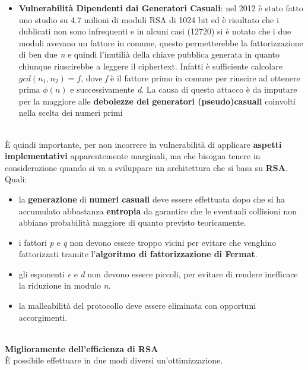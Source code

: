 \begin{itemize}
    \item \textbf{Vulnerabilità Dipendenti dai Generatori Casuali}: nel 2012 è stato fatto uno studio su 4.7 milioni di moduli RSA di 1024 bit ed è risultato che i dublicati non sono infrequenti e in alcuni casi (12720) si è notato che i due moduli avevano un fattore in comune, questo permetterebbe la fattorizzazione di ben due \textit{n} e quindi l'inutilià della chiave pubblica generata in quanto chiunque riuscirebbe a leggere il ciphertext. Infatti è sufficiente calcolare $gcd(n_1, n_2) = f$, dove \textit{f} è il fattore primo in comune per riuscire ad ottenere prima $\phi(n)$ e successivamente \textit{d}. La causa di questo attacco è da imputare per la maggiore alle \textbf{debolezze dei generatori (pseudo)casuali} coinvolti nella scelta dei numeri primi

\end{itemize}
\   \\
È quindi importante, per non incorrere in vulnerabilità di applicare \textbf{aspetti implementativi} apparentemente marginali, ma che bisogna tenere in considerazione quando si va a sviluppare un architettura che si basa su \textbf{RSA}. Quali:
\begin{itemize}
    \item la \textbf{generazione} di \textbf{numeri casuali} deve essere effettuata dopo che si ha accumulato abbastanza \textbf{entropia} da garantire che le eventuali collisioni non abbiano probabilità maggiore di quanto previsto teoricamente.
    \item i fattori \textit{p} e \textit{q} non devono essere troppo vicini per evitare che venghino fattorizzati tramite l'\textbf{algoritmo di fattorizzazione di Fermat}.
    \item gli esponenti \textit{e} e \textit{d} non devono essere piccoli, per evitare di rendere inefficace la riduzione in modulo \textit{n}.
    \item la malleabilità del protocollo deve essere eliminata con opportuni accorgimenti.
\end{itemize}
\   \\
\textbf{Miglioramente dell'efficienza di RSA} \\
È possibile effettuare in due modi diversi un'ottimizzazione.
